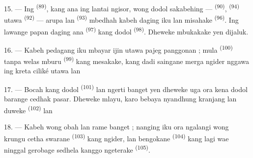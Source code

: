 \VUsaut{4.0mm}
\VUsaut{3.0mm}

15. --- Ing  \textsuperscript{(89)}, kang ana ing
lantai ngisor, wong dodol sakabehing  —  \textsuperscript{(90)},  \textsuperscript{(94)}
utawa  \textsuperscript{(92)} — arupa  lan   \textsuperscript{(93)} mbedhah kabeh daging iku lan
misahake  \textsuperscript{(96)}. Ing lawange papan
daging ana  \textsuperscript{(97)} kang dodol
 \textsuperscript{(98)}. Dheweke mbukakake yen dijaluk.

16. --- Kabeh pedagang iku mbayar ijin utawa pajeg panggonan ; mula
 \textsuperscript{(100)} tanpa welas mburu  \textsuperscript{(99)} kang mesakake, kang dadi
saingane merga ngider nggawa ing kreta ciliké  utawa  lan 

\VUsaut{4.0mm}
\VUsaut{3.0mm}

17. --- Bocah kang dodol  \textsuperscript{(101)} lan
 ngerti banget yen dheweke uga ora kena dodol barange
cedhak pasar. Dheweke mlayu, karo bebaya nyandhung kranjang
 lan  duweke 
\textsuperscript{(102)}  lan 

18. --- Kabeh wong obah lan rame banget ; nanging iku ora ngalangi wong
krungu cetha swarane  \textsuperscript{(103)} kang
ngider, lan bengokane  \textsuperscript{(104)} kang
lagi wae ninggal gerobage sedhela kanggo ngeterake  \textsuperscript{(105)}.

\VUsaut{6.0mm}
\VUfilet{22mm}
